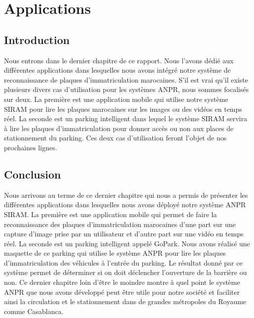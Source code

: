 \chapter{\textbf{Applications}}
    \section{Introduction}
    Nous entrons dans le dernier chapitre de ce rapport. Nous l’avons dédié aux différentes applications dans lesquelles nous avons intégré notre système de reconnaissance de plaques d’immatriculation marocaines. S’il est vrai qu’il existe plusieurs divers cas d’utilisation pour les systèmes ANPR, nous sommes focalisés sur deux. La première est une application mobile qui utilise notre système SIRAM pour lire les plaques marocaines sur les images ou des vidéos en temps réel. La seconde est un parking intelligent dans lequel le système SIRAM servira à lire les plaques d’immatriculation pour donner accès ou non aux places de stationnement du parking. Ces deux cas d’utilisation feront l’objet de nos prochaines lignes.

    
    
    
    \section{Conclusion}
    Nous arrivons au terme de ce dernier chapitre qui nous a permis de présenter les différentes applications dans lesquelles nous avons déployé notre système ANPR SIRAM. La première est une application mobile qui permet de faire la reconnaissance des plaques d’immatriculation marocaines d’une part  sur une capture d’image prise par un utilisateur et d’autre part sur une vidéo en temps réel. La seconde est un parking intelligent appelé GoPark. Nous avons réalisé une maquette de ce parking qui utilise le système ANPR pour lire les plaques d’immatriculation des véhicules à l’entrée du parking. Le résultat donné par ce système permet de déterminer si on doit déclencher l’ouverture de la barrière ou non. Ce dernier chapitre loin d’être le moindre montre à quel point le système ANPR que nous avons développé peut être utile pour notre société et faciliter ainsi la circulation et le stationnement dans de grandes métropoles du Royaume comme Casablanca. 
